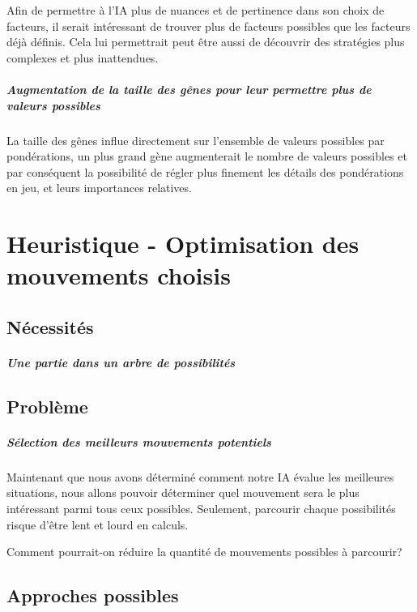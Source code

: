 \documentclass{scrreprt}
\begin{document}
			Afin de permettre à l'IA plus de nuances et de pertinence dans son choix de facteurs, il serait intéressant de trouver plus de facteurs possibles que les facteurs déjà définis. Cela lui permettrait peut être aussi de découvrir des stratégies plus complexes et plus inattendues.
			
			\paragraph{Augmentation de la taille des gênes pour leur permettre plus de valeurs possibles}
			
			La taille des gênes influe directement sur l'ensemble de valeurs possibles par pondérations, un plus grand gène augmenterait le nombre de valeurs possibles et par conséquent la possibilité de régler plus finement les détails des pondérations en jeu, et leurs importances relatives.

	\chapter{Heuristique - Optimisation des mouvements choisis}
		\section{Nécessités}
			\paragraph{Une partie dans un arbre de possibilités}
			
			
		
		\section{Problème}
			\paragraph{Sélection des meilleurs mouvements potentiels}
			
			Maintenant que nous avons déterminé comment notre IA évalue les meilleures situations, nous allons pouvoir déterminer quel mouvement sera le plus intéressant parmi tous ceux possibles. Seulement, parcourir chaque possibilités risque d'être lent et lourd en calculs.
			
			Comment pourrait-on réduire la quantité de mouvements possibles à parcourir? 
			
		\section{Approches possibles}
\end{document}
